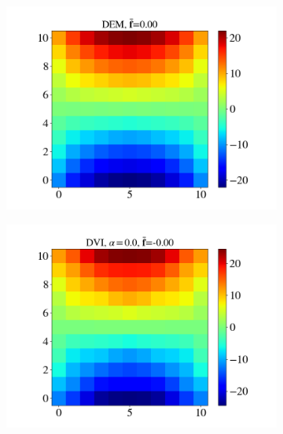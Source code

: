 \begin{itemize}
	\begin{figure}[H]
		\centering	
		\begin{subfigure}{0.32\columnwidth}	
			\centering
			\includegraphics[width=1.0\textwidth]{images/CD/Example7/10/T1_11_DEM_0.png}
		\end{subfigure}
		\begin{subfigure}{0.32\columnwidth}	
			\centering
			\includegraphics[width=1.0\textwidth]{images/CD/Example7/10/T1_11_DVI_0.0.png}
		\end{subfigure}
		\begin{subfigure}{0.32\columnwidth}	
			\centering

\end{subfigure}
\end{figure}
\end{itemize}
